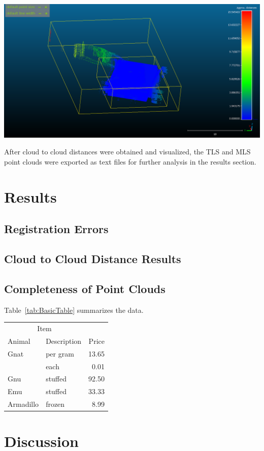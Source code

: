 \documentclass[man]{apa7}
\begin{document}
\begin{minipage}{\linewidth}
  \includegraphics[height=\textheight/2 ,width=\textwidth/1]{figures/noMaxDistance.png}
  \label{fig:nomaxdistance}
\end{minipage}

After cloud to cloud distances were obtained and visualized, the TLS and MLS point clouds were exported as text files for further analysis in the results section. 

\section{Results}

\subsection{Registration Errors}

\subsection{Cloud to Cloud Distance Results}

\subsection{Completeness of Point Clouds}

Table~\ref{tab:BasicTable} summarizes the data. 
\vspace{20pt}

\begin{minipage}{\linewidth}
  \label{tab:BasicTable}
  \begin{tabular}{@{}llr@{}}         \toprule
  \multicolumn{2}{c}{Item}        \\ \cmidrule(r){1-2}
  Animal    & Description & Price \\ \midrule
  Gnat      & per gram    & 13.65 \\
            & each        &  0.01 \\
  Gnu       & stuffed     & 92.50 \\
  Emu       & stuffed     & 33.33 \\
  Armadillo & frozen      &  8.99 \\ \bottomrule
  \end{tabular}
\end{minipage}


\section{Discussion}

\printbibliography
\end{document}
